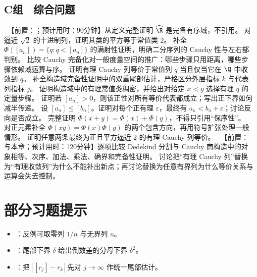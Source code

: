 \subsection*{C组　综合问题}
\begin{enumerate}[label=\textbf{\thechapter.\arabic*.},resume]
  \ 【前置：；预计用时：90分钟】从定义完整证明 \(\widehat{\R}\) 是完备有序域，不引用。
  对逼近 \(\sqrt2\) 的十进制列，证明其类的平方等于常值类 \(2\)。
  补全 \(\Phi([a_n])=\{q:q<[a_n]\}\) 的满射性证明，明确二分序列的 Cauchy 性与左右部判别。
  比较 Cauchy 完备化对一般度量空间的推广：哪些步骤只用距离，哪些步骤依赖域运算与序。
  证明有理 Cauchy 列等价于常值列 \(q\) 当且仅当它在 \(\Q\) 中收敛到 \(q\)。
  补全构造域完备性证明中的双重尾部估计，严格区分外层指标 \(k\) 与代表列指标 \(j\)。
  证明构造域中的有理常值类稠密，并给出对给定 \(x<y\) 选择有理 \(q\) 的定量步骤。
  证明若 \([a_n]>0\)，则该正性对所有等价代表都成立；写出正下界如何减半传递。
  设 \([a_n]\le[b_n]\)。证明对每个正有理 \(\varepsilon\)，最终有 \(a_n<b_n+\varepsilon\)；讨论反向是否成立。
  完整证明 \(\Phi(x+y)=\Phi(x)+\Phi(y)\)，不得只引用“保序性”。
  对正元素补全 \(\Phi(xy)=\Phi(x)\Phi(y)\) 的两个包含方向，再用符号扩张处理一般情形。
  证明任意两条最终为正且平方逼近 \(2\) 的有理 Cauchy 列等价。
  \ 【前置：与本章；预计用时：120分钟】逐项比较 Dedekind 分割与 Cauchy 商构造中的对象相等、次序、加法、乘法、确界和完备性证明。
  讨论把“有理 Cauchy 列”替换为“有理收敛列”为什么不能补出新点；再讨论替换为任意有界列为什么等价关系与运算会失去控制。
\end{enumerate}

\section*{部分习题提示}
\begin{itemize}
 \item {}：反例可取零列 \(1/n\) 与无界列 \(n\)。
 \item {}：尾部下界 \(\delta\) 给出倒数差的分母下界 \(\delta^2\)。
 \item {}：把 \(|[r_j]-r_k|\) 先对 \(j\to\infty\) 作统一尾部估计。
\end{itemize}
